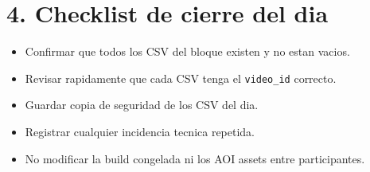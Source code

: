 \documentclass[10pt]{article}
\begin{document}
\section*{4. Checklist de cierre del dia}
\begin{itemize}
  \item Confirmar que todos los CSV del bloque existen y no estan vacios.
  \item Revisar rapidamente que cada CSV tenga el \texttt{video\_id} correcto.
  \item Guardar copia de seguridad de los CSV del dia.
  \item Registrar cualquier incidencia tecnica repetida.
  \item No modificar la build congelada ni los AOI assets entre participantes.
\end{itemize}
\end{document}
